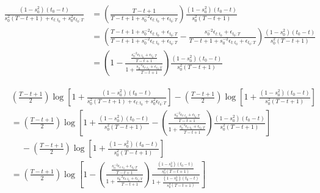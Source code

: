 \documentclass{article}
\begin{document}
\begin{align*}
    \frac{(1 - s_0^2)(t_0 - t)}{s_0^{2}(T-t+1) + \epsilon_{t:t_0} + s_0^{2}\epsilon_{t_0:T}} &= \left(\frac{T-t+1 }{T-t+1 + s_0^{-2}\epsilon_{t:t_0} + \epsilon_{t_0:T}}\right)\frac{(1 - s_0^2)(t_0 - t)}{s_0^{2}(T-t+1)} \\
    &= \left(\frac{T-t+1 + s_0^{-2}\epsilon_{t:t_0} + \epsilon_{t_0:T}}{T-t+1 + s_0^{-2}\epsilon_{t:t_0} + \epsilon_{t_0:T}} - \frac{s_0^{-2}\epsilon_{t:t_0} + \epsilon_{t_0:T}}{T-t+1 + s_0^{-2}\epsilon_{t:t_0} + \epsilon_{t_0:T}}\right)\frac{(1 - s_0^2)(t_0 - t)}{s_0^{2}(T-t+1)} \\
    &= \left(1 - \frac{\frac{s_0^{-2}\epsilon_{t:t_0} + \epsilon_{t_0:T}}{T-t+1}}{1 + \frac{s_0^{-2}\epsilon_{t:t_0} + \epsilon_{t_0:T}}{T-t+1}}\right)\frac{(1 - s_0^2)(t_0 - t)}{s_0^{2}(T-t+1)}
\end{align*}

\begin{align*}
    & \left(\frac{T - t +1}{2}\right)\log\left[1 + \frac{(1 - s_0^2)(t_0 - t)}{s_0^{2}(T-t+1) + \epsilon_{t:t_0} + s_0^{2}\epsilon_{t_0:T} }\right] - \left(\frac{T - t +1}{2}\right)\log\left[1 + \frac{(1 - s_0^2)(t_0 - t)}{s_0^{2}(T-t+1) }\right]  \\
    &= \left(\frac{T - t +1}{2}\right)\log\left[1 + \frac{(1 - s_0^2)(t_0 - t)}{s_0^{2}(T-t+1) } - \left(\frac{\frac{s_0^{-2}\epsilon_{t:t_0} + \epsilon_{t_0:T}}{T-t+1}}{1 + \frac{s_0^{-2}\epsilon_{t:t_0} + \epsilon_{t_0:T}}{T-t+1}}\right)\frac{(1 - s_0^2)(t_0 - t)}{s_0^{2}(T-t+1)}\right] \\
    &\quad\: - \left(\frac{T - t +1}{2}\right)\log\left[1 + \frac{(1 - s_0^2)(t_0 - t)}{s_0^{2}(T-t+1) }\right] \\
    &= \left(\frac{T - t +1}{2}\right)\log\left[1 - \left(\frac{\frac{s_0^{-2}\epsilon_{t:t_0} + \epsilon_{t_0:T}}{T-t+1}}{1 + \frac{s_0^{-2}\epsilon_{t:t_0} + \epsilon_{t_0:T}}{T-t+1}}\right)\frac{\frac{(1 - s_0^2)(t_0 - t)}{s_0^{2}(T-t+1)}}{1 + \frac{(1 - s_0^2)(t_0 - t)}{s_0^{2}(T-t+1) }}\right]
\end{align*}
\end{document}

